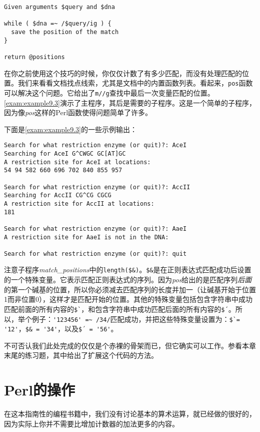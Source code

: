 \begin{lstlisting}
Given arguments $query and $dna

while ( $dna =~ /$query/ig ) {
  save the position of the match
}

return @positions
\end{lstlisting}

在你之前使用这个技巧的时候，你仅仅计数了有多少匹配，而没有处理匹配的位置。我们来看看文档找点线索，尤其是文档中的内置函数列表。看起来，\verb|pos|函数可以解决这个问题。它给出了\verb|m//g|查找中最后一次变量匹配的位置。\autoref{exam:example9.3}演示了主程序，其后是需要的子程序。这是一个简单的子程序，因为像\textit{pos}这样的Perl函数使得问题简单了许多。



下面是\autoref{exam:example9.3}的一些示例输出：

\begin{lstlisting}
Search for what restriction enzyme (or quit)?: AceI
Searching for AceI G^CWGC GC[AT]GC
A restriction site for AceI at locations:
54 94 582 660 696 702 840 855 957

Search for what restriction enzyme (or quit)?: AccII
Searching for AccII CG^CG CGCG
A restriction site for AccII at locations:
181

Search for what restriction enzyme (or quit)?: AaeI
A restriction site for AaeI is not in the DNA:

Search for what restriction enzyme (or quit)?: quit
\end{lstlisting}

注意子程序\textit{match\_positions}中的\verb|length($&)|。\verb|$&|是在正则表达式匹配成功后设置的一个特殊变量。它表示匹配正则表达式的序列。因为\textit{pos}给出的是匹配序列\textit{后面}的第一个碱基的位置，所以你必须减去匹配序列的长度并加一（让碱基开始于位置1而非位置0），这样才是匹配开始的位置。其他的特殊变量包括包含字符串中成功匹配前面的所有内容的\verb|$`|，和包含字符串中成功匹配后面的所有内容的\verb|$´|。所以，举个例子：\verb|'123456' =~ /34/|匹配成功，并把这些特殊变量设置为：\verb|$`= '12'|，\verb|$& = '34'|，以及\verb|$´ = '56'|。

不可否认我们此处完成的仅仅是个赤裸的骨架而已，但它确实可以工作。参看本章末尾的练习题，其中给出了扩展这个代码的方法。

\section{Perl的操作}
在这本指南性的编程书籍中，我们没有讨论基本的算术运算，就已经做的很好的，因为实际上你并不需要比增加计数器的加法更多的内容。

